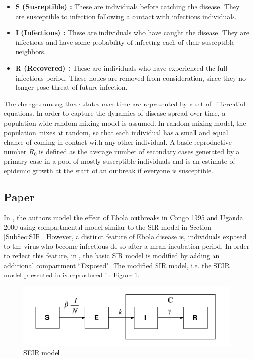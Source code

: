 \documentclass[10pt, journal,onecolumn]{IEEEtran}
\begin{document}
\begin{itemize}
\item \textbf{S (Susceptible) : } These are individuals before catching the disease. They are susceptible to infection following a contact with infectious individuals.
\item \textbf{I (Infectious) : }These are individuals who have caught the disease. They are infectious and have some probability of infecting each of their susceptible neighbors.
\item \textbf{R (Recovered) : }These are individuals who have experienced the full infectious period. These nodes are removed from consideration, since they no longer pose threat of future infection.
\end{itemize}

The changes among these states over time are represented by a set of differential equations. In order to capture the dynamics of disease spread over time, a population-wide random mixing model is assumed. In random mixing model, the population mixes at random, so that each individual has a small and equal chance of coming in contact with any other individual. A basic reproductive number $R_0$ is defined as the average number of secondary cases generated by a primary case in a pool of mostly susceptible individuals and is an estimate of epidemic growth at the start of an outbreak if everyone is susceptible.


\subsection{\textbf{Paper \citep{chowell2004basic}}}

In \citep{chowell2004basic}, the authors model the effect of Ebola outbreaks in Congo 1995 and Uganda
2000 using compartmental model similar to the SIR model in Section \ref{SubSec:SIR}. However, a
distinct feature of Ebola disease is, individuals exposed to the virus who become infectious do so
after a mean incubation period. In order to reflect this feature, in \citep{chowell2004basic}, the
basic SIR model is modified by adding an additional compartment ``Exposed". The modified SIR model,
i.e. the SEIR model presented in \citep{chowell2004basic} is reproduced in
Figure \ref{fig:SEIR_model}.

\begin{figure}[h!]
\captionsetup{justification=centering}
\includegraphics[scale=0.5]{seir_model_fig}
\centering\caption{SEIR model}
\label{fig:SEIR_model}
\end{figure}
\end{document}
